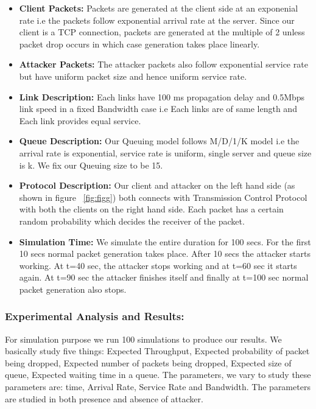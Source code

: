 \begin{itemize}

\item \textbf{Client Packets:} Packets are generated at the client side at an exponenial rate i.e the packets follow exponential arrival rate at the server. Since our client is a TCP connection, packets are generated at the multiple of 2 unless packet drop occurs in which case generation takes place linearly.  

\item \textbf{Attacker Packets:} The attacker packets also follow exponential service rate but have uniform packet size and hence uniform service rate.

\item \textbf{Link Description:} Each links have 100 ms propagation delay and 0.5Mbps link speed in a fixed Bandwidth case i.e Each links are of same length and Each link provides equal service.

\item \textbf{Queue Description:} Our Queuing model follows M/D/1/K model i.e the arrival rate is exponential, service rate is uniform, single server and queue size is k. We fix our Queuing size to be 15.

\item \textbf{Protocol Description:} Our client and attacker on the left hand side (as shown in figure ~\ref{fig:figg}) both connects with Transmission Control Protocol with both the clients on the right hand side. Each packet has a certain random probability which decides the receiver of the packet.

\item \textbf{Simulation Time:} We simulate the entire duration for 100 secs. For the first 10 secs normal packet generation takes place. After 10 secs the attacker starts working. At t=40 sec, the attacker stops working and at t=60 sec it starts again. At t=90 sec the attacker finishes itself and finally at t=100 sec normal packet generation also stops.

\end{itemize}

\subsubsection{Experimental Analysis and Results:}
\medskip

For simulation purpose we run 100 simulations to produce our results. We basically study five things: Expected Throughput, Expected probability of packet being dropped, Expected number of packets being dropped, Expected size of queue, Expected waiting time in a queue. The parameters, we vary to study these parameters are: time, Arrival Rate, Service Rate and Bandwidth. The parameters are studied in both presence and absence of attacker. 
  
